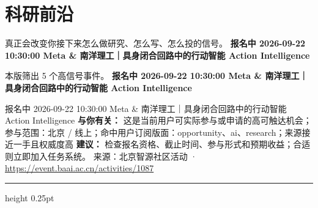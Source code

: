 \documentclass[10.5pt]{ctexart}
\begin{document}
\section*{科研前沿}
{\color{ormuted} 真正会改变你接下来怎么做研究、怎么写、怎么投的信号。}
\vspace{2mm}
{\LARGE\bfseries 报名中 2026-09-22 10:30:00 Meta \& 南洋理工｜具身闭合回路中的行动智能 Action Intelligence}\par
\vspace{1mm}
{\color{ormuted} 本版筛出 5 个高信号事件。}
\vspace{3mm}
{\Large\bfseries 报名中 2026-09-22 10:30:00 Meta \& 南洋理工｜具身闭合回路中的行动智能 Action Intelligence}\par
报名中 2026-09-22 10:30:00 Meta \& 南洋理工｜具身闭合回路中的行动智能 Action Intelligence
\textbf{与你有关：} 这是当前用户可实际参与或申请的高可触达机会；参与范围：北京 / 线上；命中用户订阅版面：opportunity、ai、research；来源接近一手且权威度高
\textbf{建议：} 检查报名资格、截止时间、参与形式和预期收益；合适则立即加入任务系统。
{\footnotesize\color{ormuted} 来源：北京智源社区活动 · \url{https://event.baai.ac.cn/activities/1087}}
\vspace{4mm}
\hrule height 0.25pt
\vspace{3mm}
\end{document}
